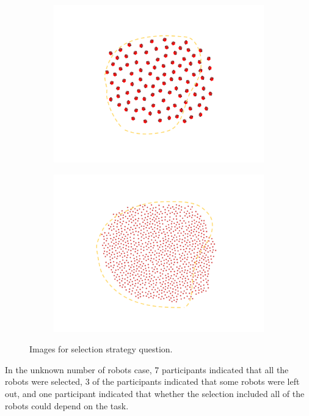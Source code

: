\begin{figure}
\begin{subfigure}{0.48\textwidth}
		\includegraphics[width=\linewidth]{../Selection_Fuzz_100.png}
	\end{subfigure}
	\begin{subfigure}{0.48\textwidth}
		\includegraphics[width=\linewidth]{../Selection_Fuzz_1000.png}
	\end{subfigure}
	\caption{Images for selection strategy question.}
	\label{strategy_question}
\end{figure}

In the unknown number of robots case, 7 participants indicated that all the robots were selected, 3 of the participants indicated that some robots were left out, and one participant indicated that whether the selection included all of the robots could depend on the task. 

